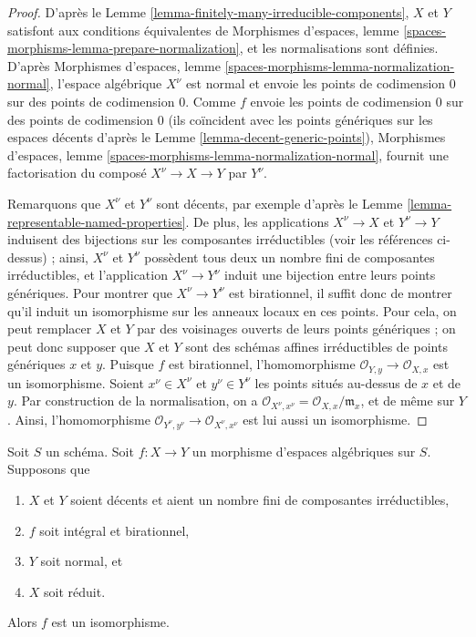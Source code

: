 \begin{proof}
D'après le Lemme \ref{lemma-finitely-many-irreducible-components},
$X$ et $Y$ satisfont aux conditions équivalentes de Morphismes d'espaces,
lemme \ref{spaces-morphisms-lemma-prepare-normalization}, et les
normalisations sont définies. D'après Morphismes d'espaces, lemme
\ref{spaces-morphisms-lemma-normalization-normal}, l'espace algébrique
$X^\nu$ est normal et envoie les points de codimension $0$ sur des points de
codimension $0$. Comme $f$ envoie les points de codimension $0$ sur des
points de codimension $0$ (ils coïncident avec les points génériques sur les
espaces décents d'après le Lemme \ref{lemma-decent-generic-points}),
Morphismes d'espaces, lemme
\ref{spaces-morphisms-lemma-normalization-normal}, fournit une factorisation
du composé $X^\nu \to X \to Y$ par $Y^\nu$.

\medskip\noindent
Remarquons que $X^\nu$ et $Y^\nu$ sont décents, par exemple d'après le
Lemme \ref{lemma-representable-named-properties}.
De plus, les applications $X^\nu \to X$ et $Y^\nu \to Y$ induisent des
bijections sur les composantes irréductibles (voir les références ci-dessus) ;
ainsi, $X^\nu$ et $Y^\nu$ possèdent tous deux un nombre fini de composantes
irréductibles, et l'application $X^\nu \to Y^\nu$ induit une bijection entre
leurs points génériques. Pour montrer que $X^\nu \to Y^\nu$ est birationnel,
il suffit donc de montrer qu'il induit un isomorphisme sur les anneaux locaux
en ces points. Pour cela, on peut remplacer $X$ et $Y$ par des voisinages
ouverts de leurs points génériques ; on peut donc supposer que $X$ et $Y$
sont des schémas affines irréductibles de points génériques $x$ et $y$.
Puisque $f$ est birationnel, l'homomorphisme
$\mathcal{O}_{Y, y} \to \mathcal{O}_{X, x}$ est un isomorphisme.
Soient $x^\nu \in X^\nu$ et $y^\nu \in Y^\nu$ les points situés au-dessus
de $x$ et de $y$. Par construction de la normalisation, on a
$\mathcal{O}_{X^\nu, x^\nu} = \mathcal{O}_{X, x}/\mathfrak m_x$,
et de même sur $Y$. Ainsi, l'homomorphisme
$\mathcal{O}_{Y^\nu, y^\nu} \to \mathcal{O}_{X^\nu, x^\nu}$
est lui aussi un isomorphisme.
\end{proof}

\begin{lemma}
\label{lemma-finite-birational-over-normal}
Soit $S$ un schéma. Soit $f : X \to Y$ un morphisme d'espaces algébriques
sur $S$. Supposons que
\begin{enumerate}
\item $X$ et $Y$ soient décents et aient un nombre fini de composantes
irréductibles,
\item $f$ soit intégral et birationnel,
\item $Y$ soit normal, et
\item $X$ soit réduit.
\end{enumerate}
Alors $f$ est un isomorphisme.
\end{lemma}

